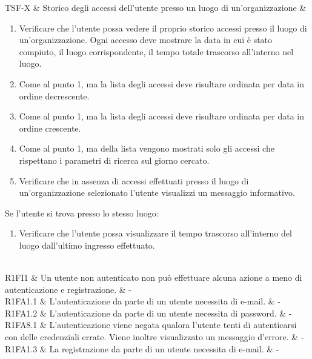 TSF-X & Storico degli accessi dell'utente presso un luogo di un'organizzazione & \begin{enumerate}
    \item Verificare che l'utente possa vedere il proprio storico accessi presso il luogo di un'organizzazione. Ogni accesso deve mostrare la data in cui è stato compiuto, il luogo corrispondente, il tempo totale trascorso all'interno nel luogo.
    \item Come al punto 1, ma la lista degli accessi deve risultare ordinata per data in ordine decrescente.
    \item Come al punto 1, ma la lista degli accessi deve risultare ordinata per data in ordine crescente.
    \item Come al punto 1, ma della lista vengono mostrati solo gli accessi che rispettano i parametri di ricerca sul giorno cercato.
    \item Verificare che in assenza di accessi effettuati presso il luogo di un'organizzazione selezionato l'utente visualizzi un messaggio informativo.
\end{enumerate}
Se l'utente si trova presso lo stesso luogo:
\begin{enumerate}
    \item Verificare che l'utente possa visualizzare il tempo trascorso all'interno del luogo dall'ultimo ingresso effettuato.
\end{enumerate} \\









R1FI1 & Un utente non autenticato non può effettuare alcuna azione a meno di autenticazione e registrazione. & - \\

R1FA1.1 & L'autenticazione da parte di un utente necessita di e-mail. & - \\

R1FA1.2 & L'autenticazione da parte di un utente necessita di password.  & - \\

R1FA8.1 & L'autenticazione viene negata qualora l'utente tenti di autenticarsi con delle credenziali errate. Viene inoltre visualizzato un messaggio d'errore. & - \\

R1FA1.3 & La registrazione da parte di un utente necessita di e-mail. & - \\

